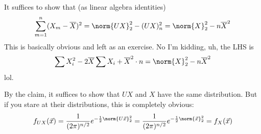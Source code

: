 \documentclass[11pt, headheight=30pt]{scrartcl}
\begin{document}
It suffices to show that (as linear algebra identities)
\[
    \sum_{m = 1}^n (X_m - \overline{X})^2 = \norm{UX}_2^2 - (UX)_n^2 = \norm{X}_2^2 - n\overline{X}^2
\]
This is basically obvious and left as an exercise. No I'm kidding,
uh, the LHS is
\[
    \sum X_i^2 - 2\overline{X}\sum X_i + \overline{X}^2 \cdot n = \norm{X}_2^2 - n\overline{X}^2
\]
lol.

By the claim, it suffices to show that
$UX$ and $X$ have the same distribution.
But if you stare at their distributions, this is completely obvious:
\[
    f_{UX}(\vec{x}) = \frac{1}{(2\pi)^{n/2}} e^{-\frac{1}{2}\norm{U\vec{x}}_2^2} = \frac{1}{(2\pi)^{n/2}} e^{-\frac{1}{2}\norm{\vec{x}}_2^2} = f_X(\vec{x})
\]



\end{document}
